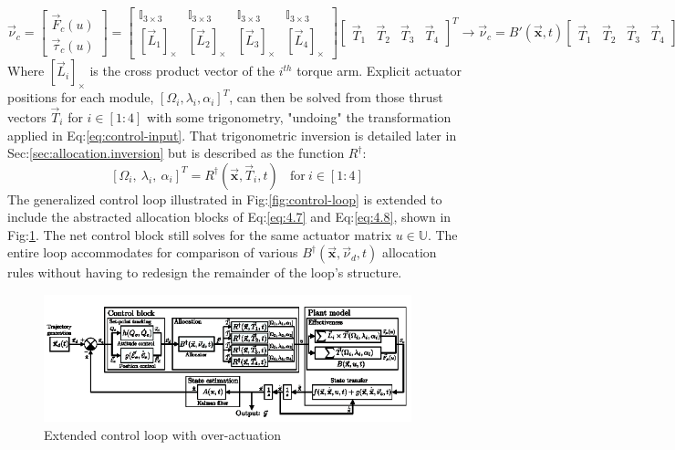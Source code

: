 \begin{subequations}\label{eq:4.7}
\begin{equation}
\vec{\nu}_c=\begin{bmatrix}
\vec{F}_c(u)\\
\vec{\tau}_c(u)
\end{bmatrix}
= 
\begin{bmatrix}
\mathbb{I}_{3\times 3} & \mathbb{I}_{3\times 3} & \mathbb{I}_{3\times 3} & \mathbb{I}_{3\times 3}\\
[\vec{L}_1]_\times & [\vec{L}_2]_\times & [\vec{L}_3]_\times & [\vec{L}_4]_\times
\end{bmatrix}
\begin{bmatrix}
\vec{T}_1&
\vec{T}_2&
\vec{T}_3&
\vec{T}_4
\end{bmatrix}^T
\end{equation}
\begin{equation}
\rightarrow\vec{\nu}_c=B'(\vec{\mathbf{x}},t)\begin{bmatrix}
\vec{T}_1&
\vec{T}_2&
\vec{T}_3&
\vec{T}_4
\end{bmatrix}^T
\end{equation}
\end{subequations}
Where $[\vec{L}_i]_\times$ is the cross product vector of the $i^{th}$ torque arm. Explicit actuator positions for each module, $[\Omega_i,\lambda_i,\alpha_i]^T$, can then be solved from those thrust vectors $\vec{T}_i$ for $i\in[1:4]$ with some trigonometry, "undoing" the transformation applied in Eq:\ref{eq:control-input}. That trigonometric inversion is detailed later in Sec:\ref{sec:allocation.inversion} but is described as the function $R^\dagger$:
\begin{equation}\label{eq:4.8}
[\Omega_i,~\lambda_i,~\alpha_i]^T=R^\dagger(\vec{\mathbf{x}},\vec{T}_i,t)~~~~\text{for}~i\in[1:4]
\end{equation}
The generalized control loop illustrated in Fig:\ref{fig:control-loop} is extended to include the abstracted allocation blocks of Eq:\ref{eq:4.7} and Eq:\ref{eq:4.8}, shown in Fig:\ref{fig:control-block}. The net control block still solves for the same actuator matrix $u\in\mathbb{U}$. The entire loop accommodates for comparison of various $B^\dagger(\vec{\mathbf{x}},\vec{\nu}_d,t)$ allocation rules without having to redesign the remainder of the loop's structure.
\begin{figure}[htbp]
\vspace{-8pt}
\centering
\includegraphics[width=0.95\textwidth]{figs/control-block}
\caption{Extended control loop with over-actuation}
\label{fig:control-block}
\vspace{-16pt}
\end{figure}
